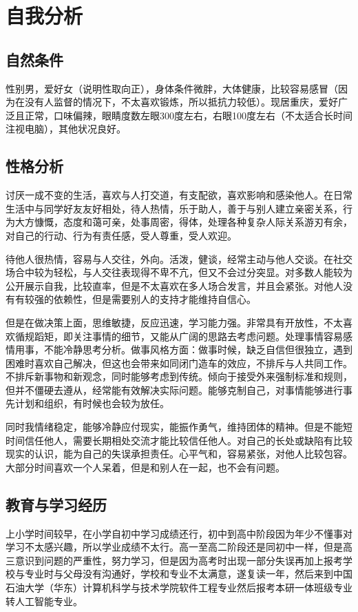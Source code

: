 \documentclass{article}
\begin{document}
\thispagestyle{empty}
\newpage
\setcounter{page}{1}
\section{自我分析}
	
\subsection{自然条件}
性别男，爱好女（说明性取向正），身体条件微胖，大体健康，比较容易感冒（因为在没有人监督的情况下，不太喜欢锻炼，所以抵抗力较低）。现居重庆，爱好广泛且正常，口味偏辣，眼睛度数左眼300度左右，右眼100度左右（不太适合长时间注视电脑），其他状况良好。\par
\subsection{性格分析}
讨厌一成不变的生活，喜欢与人打交道，有支配欲，喜欢影响和感染他人。在日常生活中与同学好友友好相处，待人热情，乐于助人，善于与别人建立亲密关系，行为大方慷慨，态度和蔼可亲，处事周密，得体，处理各种复杂人际关系游刃有余，对自己的行动、行为有责任感，受人尊重，受人欢迎。\par
待他人很热情，容易与人交往，外向。活泼，健谈，经常主动与他人交谈。在社交场合中较为轻松，与人交往表现得不卑不亢，但又不会过分突显。对多数人能较为公开展示自我，比较直率，但是不太喜欢在多人场合发言，并且会紧张。对他人没有有较强的依赖性，但是需要别人的支持才能维持自信心。\par
但是在做决策上面，思维敏捷，反应迅速，学习能力强。非常具有开放性，不太喜欢循规蹈矩，即关注事情的细节，又能从广阔的思路去考虑问题。处理事情容易感情用事，不能冷静思考分析。做事风格方面：做事时候，缺乏自信但很独立，遇到困难时喜欢自己解决，但这也会带来如同闭门造车的效应，不排斥与人共同工作。不排斥新事物和新观念，同时能够考虑到传统。倾向于接受外来强制标准和规则，但并不僵硬去遵从，经常能有效解决实际问题。能够克制自己，对事情能够进行事先计划和组织，有时候也会较为放任。\par
同时我情绪稳定，能够冷静应付现实，能振作勇气，维持团体的精神。但是不能短时间信任他人，需要长期相处交流才能比较信任他人。对自己的长处或缺陷有比较现实的认识，能为自己的失误承担责任。心平气和，容易紧张，对他人比较包容。大部分时间喜欢一个人呆着，但是和别人在一起，也不会有问题。\par
\subsection{教育与学习经历}
上小学时间较早，在小学自初中学习成绩还行，初中到高中阶段因为年少不懂事对学习不太感兴趣，所以学业成绩不太行。高一至高二阶段还是同初中一样，但是高三意识到问题的严重性，努力学习，但是因为高考时出现一部分失误再加上报考学校与专业时与父母没有沟通好，学校和专业不太满意，遂复读一年，然后来到中国石油大学（华东）计算机科学与技术学院软件工程专业然后报考本研一体班级专业转人工智能专业。\par
\end{document}
